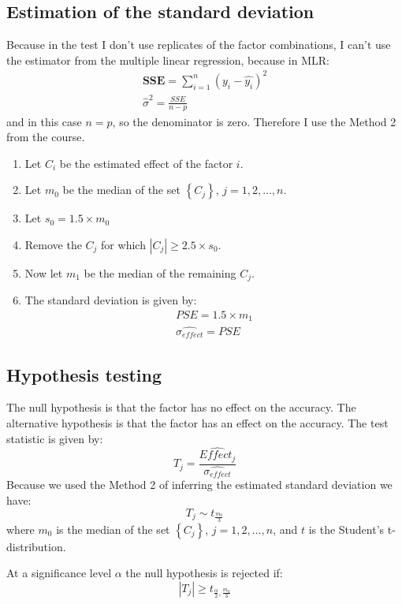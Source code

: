 \documentclass{article}
\begin{document}
\subsection{Estimation of the standard deviation}

Because in the test I don't use replicates of the factor combinations, I can't use the estimator from the multiple linear regression, because in MLR:
\begin{align}
    \mathbf{SSE} = \sum_{i=1}^{n} \left(y_i - \hat{y_i} \right)^2 \\
    \hat{\sigma}^2 = \frac{SSE}{n-p}
\end{align}
and in this case $n=p$, so the denominator is zero. Therefore I use the Method 2 from the course.
\begin{enumerate}
    \item Let $C_i$ be the estimated effect of the factor $i$.
    \item Let $m_0$ be the median of the set $\left\{C_j\right\}$, $j=1,2,\dots,n$.
    \item Let $s_0=1.5\times m_0$
    \item Remove the $C_j$ for which $|C_j|\geq2.5\times s_0$.
    \item Now let $m_1$ be the median of the remaining $C_j$.
    \item The standard deviation is given by:
          \begin{align}
              PSE = 1.5\times m_1 \\
              \widehat{\sigma_{effect}} = PSE
          \end{align}
\end{enumerate}

\subsection{Hypothesis testing}

The null hypothesis is that the factor has no effect on the accuracy. The alternative hypothesis is that the factor has an effect on the accuracy. The test statistic is given by:
\begin{equation}
    T_j = \frac{\widehat{Effect_j}}{\widehat{\sigma_{effect}}}
\end{equation}
Because we used the Method 2 of inferring the estimated standard deviation we have:
\begin{equation}
    T_j \sim t_{\frac{m_0}{3}}
\end{equation}
where $m_0$ is the median of the set $\left\{C_j\right\}$, $j=1,2,\dots,n$, and $t$ is the Student's t-distribution.

At a significance level $\alpha$ the null hypothesis is rejected if:
\begin{equation}
    |T_j| \geq t_{\frac{\alpha}{2}, \frac{m_0}{3}}
\end{equation}
\end{document}
